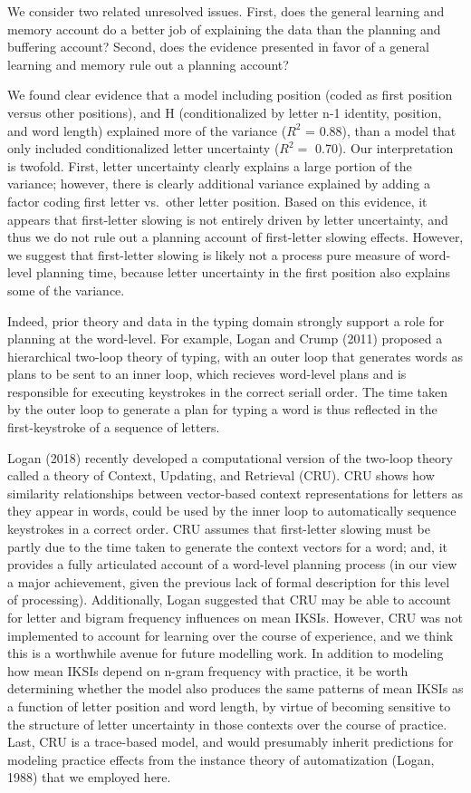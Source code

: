 \documentclass[,man,floatsintext]{apa6}
\begin{document}
We consider two related unresolved issues. First, does the general learning and memory account do a better job of explaining the data than the planning and buffering account? Second, does the evidence presented in favor of a general learning and memory rule out a planning account?

We found clear evidence that a model including position (coded as first position versus other positions), and H (conditionalized by letter n-1 identity, position, and word length) explained more of the variance (\(R^2\) = 0.88), than a model that only included conditionalized letter uncertainty (\(R^2 =\) 0.70). Our interpretation is twofold. First, letter uncertainty clearly explains a large portion of the variance; however, there is clearly additional variance explained by adding a factor coding first letter vs.~other letter position. Based on this evidence, it appears that first-letter slowing is not entirely driven by letter uncertainty, and thus we do not rule out a planning account of first-letter slowing effects. However, we suggest that first-letter slowing is likely not a process pure measure of word-level planning time, because letter uncertainty in the first position also explains some of the variance.

Indeed, prior theory and data in the typing domain strongly support a role for planning at the word-level. For example, Logan and Crump (2011) proposed a hierarchical two-loop theory of typing, with an outer loop that generates words as plans to be sent to an inner loop, which recieves word-level plans and is responsible for executing keystrokes in the correct seriall order. The time taken by the outer loop to generate a plan for typing a word is thus reflected in the first-keystroke of a sequence of letters.

Logan (2018) recently developed a computational version of the two-loop theory called a theory of Context, Updating, and Retrieval (CRU). CRU shows how similarity relationships between vector-based context representations for letters as they appear in words, could be used by the inner loop to automatically sequence keystrokes in a correct order. CRU assumes that first-letter slowing must be partly due to the time taken to generate the context vectors for a word; and, it provides a fully articulated account of a word-level planning process (in our view a major achievement, given the previous lack of formal description for this level of processing). Additionally, Logan suggested that CRU may be able to account for letter and bigram frequency influences on mean IKSIs. However, CRU was not implemented to account for learning over the course of experience, and we think this is a worthwhile avenue for future modelling work. In addition to modeling how mean IKSIs depend on n-gram frequency with practice, it be worth determining whether the model also produces the same patterns of mean IKSIs as a function of letter position and word length, by virtue of becoming sensitive to the structure of letter uncertainty in those contexts over the course of practice. Last, CRU is a trace-based model, and would presumably inherit predictions for modeling practice effects from the instance theory of automatization (Logan, 1988) that we employed here.
\end{document}
